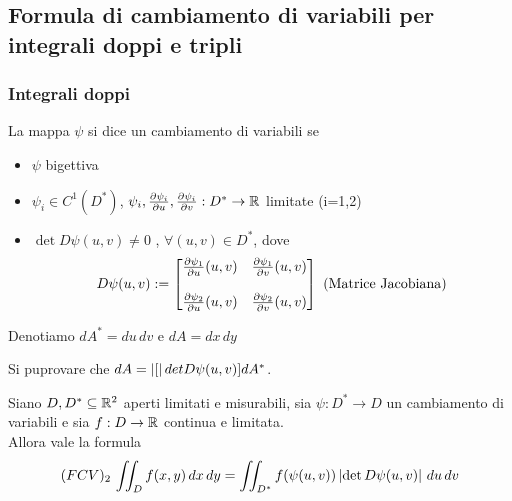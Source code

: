 \subsection{Formula di cambiamento di variabili per integrali doppi e tripli}
\subsubsection{Integrali doppi}
\begin{definition}
  \label{cambiamentovariabili}
  La mappa $\psi$ si dice un cambiamento di variabili se
  \begin{itemize}
    \item $\psi$ \ace bigettiva
    \item $\psi_i \in C^1(D^*)$, $\psi_i, \frac{\partial \psi_i}{\partial u}, \frac{\partial \psi_i}{\partial v} : D^* \to \mathbb{R}$ limitate (i=1,2)
    \item $\det D\psi(u,v)\not = 0$ , $\forall (u,v)\in D^*$, dove
          $$D \psi(u,v) := \begin{bmatrix}
            \frac{\partial \psi_1}{\partial u} (u,v) & \frac{\partial \psi_1}{\partial v} (u,v)\\
            \\
            \frac{\partial \psi_2}{\partial u} (u,v) & \frac{\partial \psi_2}{\partial v} (u,v) \\
          \end{bmatrix} \text{ (Matrice Jacobiana)}$$
  \end{itemize}
  Denotiamo $dA^* = du\,dv$ e $dA = dx\,dy$
\end{definition}
Si pu\aco provare che $dA = \left\lvert [ \right\rvert det D\psi(u,v)] dA^*$.\\
\begin{theorem}
  Siano $D, D^* \subseteq \mathbb{R}^2$ aperti limitati e misurabili, sia $\psi : D^* \to D$
  un cambiamento di variabili e sia $f:D \to \mathbb{R}$ continua e limitata. \\
  Allora vale la formula
  $$(FCV)_2 \, \iint_{D} f(x,y) \,dx\,dy = \iint_{D^*} f(\psi(u,v))\left\lvert \det D\psi(u,v) \right\rvert \,du\,dv$$ 
\end{theorem}
